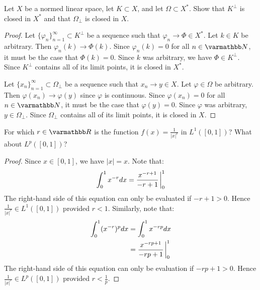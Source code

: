 \documentclass[10pt,oneside,openany]{memoir}
\begin{document}
\newpage
\begin{exercise}
    Let $X$ be a normed linear space, let $K \subset X$, and let $\Omega \subset X^\ast$. Show that $K^\perp$ is closed in $X^\ast$ and that $\Omega_{\perp}$ is closed in $X$.
\end{exercise}
    \begin{proof}
        Let $\{\varphi_n\}_{n = 1}^\infty \subset K^\perp$ be a sequence such that $\varphi_n \rightarrow \varPhi \in X^\ast$. Let $k \in K$ be arbitrary. Then $\varphi_n(k) \rightarrow \varPhi(k)$. Since $\varphi_n(k) = 0$ for all $n \in \bfN$, it must be the case that $\varPhi(k) = 0$. Since $k$ was arbitrary, we have $\varPhi \in K^\perp$. Since $K^\perp$ contains all of its limit points, it is closed in $X^\ast$.

        Let $\{x_n\}_{n = 1}^\infty \subset \Omega_\perp$ be a sequence such that $x_n \rightarrow y \in X$. Let $\varphi \in \Omega$ be arbitrary. Then $\varphi(x_n) \rightarrow \varphi(y)$ since $\varphi$ is continuous. Since $\varphi(x_n) = 0$ for all $n \in \bfN$, it must be the case that $\varphi(y) = 0$. Since $\varphi$ was arbitrary, $y \in \Omega_\perp$. Since $\Omega_\perp$ contains all of its limit points, it is closed in $X$.
    \end{proof}

\begin{exercise}
For which $r \in \bfR$ is the function $f(x) = \frac{1}{|x|^r}$ in $L^1([0,1])$? What about $L^p([0,1])$?
\end{exercise}
    \begin{proof}
        Since $x \in [0,1]$, we have $|x| = x$.
        Note that:
            \begin{equation*}
            \begin{split}
                \int_0^1 x^{-r}dx = \frac{x^{-r+1}}{-r+1}\h1\bigg\rvert_{0}^1
            \end{split}
            \end{equation*}
        The right-hand side of this equation can only be evaluated if $-r+1 > 0$. Hence $\frac{1}{|x|^r} \in L^1([0,1])$ provided $r<1$. Similarly, note that:
            \begin{equation*}
            \begin{split}
                \int_0^1 (x^{-r})^p dx
                & = \int_0^1 x^{-rp}dx \\
                & = \frac{x^{-rp+1}}{-rp+1}\h1\bigg\rvert_{0}^1 \\
            \end{split}
            \end{equation*}
        The right-hand side of this equation can only be evaluation if $-rp+1 > 0$. Hence $\frac{1}{|x|^r} \in L^p([0,1])$ provided $r<\frac{1}{p}$.
    \end{proof}
    
\end{document}
